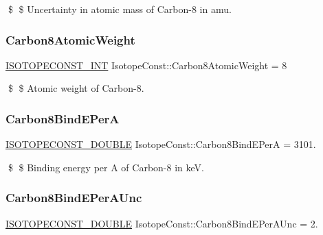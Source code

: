 \$ \$ Uncertainty in atomic mass of Carbon-\/8 in amu. \mbox{\label{group___isotope_const-_carbon-_c8_ga6acd092e90d240f1dd07d3cdaf143398}} 
\subsubsection{\texorpdfstring{Carbon8\+Atomic\+Weight}{Carbon8AtomicWeight}}
{\footnotesize\ttfamily \mbox{\hyperlink{group___isotope_const-_macros_ga5f18360b3e99483a35c32d789e62621c}{I\+S\+O\+T\+O\+P\+E\+C\+O\+N\+S\+T\+\_\+\+I\+NT}} Isotope\+Const\+::\+Carbon8\+Atomic\+Weight = 8}

\$ \$ Atomic weight of Carbon-\/8. \mbox{\label{group___isotope_const-_carbon-_c8_ga1ad2f452cd3b654e15d73f18ac101408}} 
\subsubsection{\texorpdfstring{Carbon8\+Bind\+E\+PerA}{Carbon8BindEPerA}}
{\footnotesize\ttfamily \mbox{\hyperlink{group___isotope_const-_macros_ga8f45a7272ce02c0b4c65c44636ed719a}{I\+S\+O\+T\+O\+P\+E\+C\+O\+N\+S\+T\+\_\+\+D\+O\+U\+B\+LE}} Isotope\+Const\+::\+Carbon8\+Bind\+E\+PerA = 3101.}

\$ \$ Binding energy per A of Carbon-\/8 in keV. \mbox{\label{group___isotope_const-_carbon-_c8_gad58127dcd8de407439eefc05d28a9a8e}} 
\subsubsection{\texorpdfstring{Carbon8\+Bind\+E\+Per\+A\+Unc}{Carbon8BindEPerAUnc}}
{\footnotesize\ttfamily \mbox{\hyperlink{group___isotope_const-_macros_ga8f45a7272ce02c0b4c65c44636ed719a}{I\+S\+O\+T\+O\+P\+E\+C\+O\+N\+S\+T\+\_\+\+D\+O\+U\+B\+LE}} Isotope\+Const\+::\+Carbon8\+Bind\+E\+Per\+A\+Unc = 2.}

